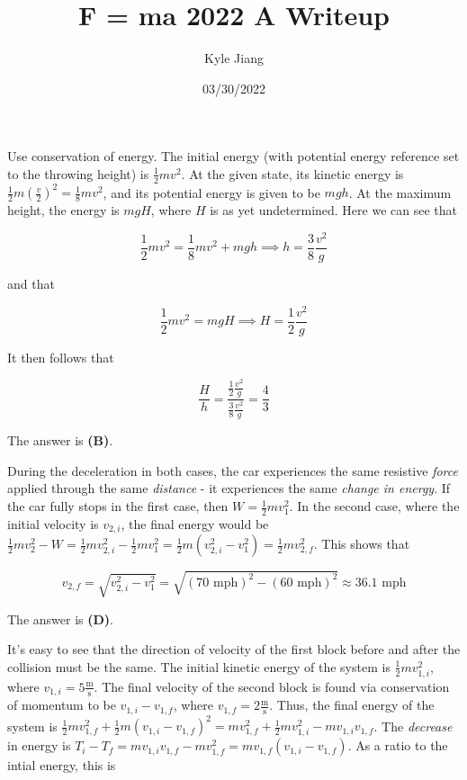 \documentclass[12pt]{article}
\title{F = ma 2022 A Writeup}
\author{Kyle Jiang}
\date{03/30/2022}
\begin{document}
\maketitle



Use conservation of energy. The initial energy (with potential energy reference set to the throwing height) is $\frac{1}{2} m v^2$. At the given state, its kinetic energy is $\frac{1}{2} m \left( \frac{v}{2} \right)^2 = \frac{1}{8} m v^2$, and its potential energy is given to be $m g h$. At the maximum height, the energy is $m g H$, where $H$ is as yet undetermined. Here we can see that

$$\frac{1}{2} m v^2 = \frac{1}{8} m v^2 + m g h \implies h = \frac{3}{8} \frac{v^2}{g}$$

and that

$$\frac{1}{2} m v^2 = m g H \implies H = \frac{1}{2} \frac{v^2}{g}$$

It then follows that

$$\frac{H}{h} = \frac{\frac{1}{2} \frac{v^2}{g}}{\frac{3}{8} \frac{v^2}{g}} = \frac{4}{3}$$

The answer is \textbf{(B)}.


\vspace{2 \baselineskip}



During the deceleration in both cases, the car experiences the same resistive \textit{force} applied through the same \textit{distance} - it experiences the same \textit{change in energy}. If the car fully stops in the first case, then $W = \frac{1}{2} m v_1^2$. In the second case, where the initial velocity is $v_{2, i}$, the final energy would be $\frac{1}{2} m v_2^2 - W = \frac{1}{2} m v_{2, i}^2 - \frac{1}{2} m v_1^2 = \frac{1}{2} m (v_{2, i}^2 - v_1^2) = \frac{1}{2} m v_{2, f}^2$. This shows that

$$v_{2, f} = \sqrt{v_{2, i}^2 - v_1^2} = \sqrt{(70 \text{ mph})^2 - (60 \text{ mph})^2} \approx 36.1 \text{ mph}$$

The answer is \textbf{(D)}.


\vspace{2 \baselineskip}



It's easy to see that the direction of velocity of the first block before and after the collision must be the same. The initial kinetic energy of the system is $\frac{1}{2} m v_{1, i}^2$, where $v_{1, i} = 5 \frac{\text{m}}{\text{s}}$. The final velocity of the second block is found via conservation of momentum to be $v_{1, i} - v_{1, f}$, where $v_{1, f} = 2 \frac{\text{m}}{\text{s}}$. Thus, the final energy of the system is $\frac{1}{2} m v_{1, f}^2 + \frac{1}{2} m (v_{1, i} - v_{1, f})^2 = m v_{1, f}^2 + \frac{1}{2} m v_{1, i}^2 - m v_{1, i} v_{1, f}$. The \textit{decrease} in energy is $T_i - T_f = m v_{1, i} v_{1, f} - m v_{1, f}^2 = m v_{1, f} (v_{1, i} - v_{1, f})$. As a ratio to the intial energy, this is
\end{document}
